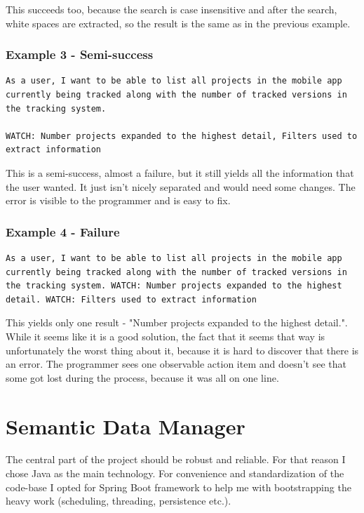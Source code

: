 This succeeds too, because the search is case insensitive and after the search, white spaces are extracted, so the result is the same as in the previous example.

\subsubsection*{Example 3 - Semi-success}

\begin{lstlisting}
As a user, I want to be able to list all projects in the mobile app currently being tracked along with the number of tracked versions in the tracking system.

WATCH: Number projects expanded to the highest detail, Filters used to extract information
\end{lstlisting}

This is a semi-success, almost a failure, but it still yields all the information that the user wanted. It just isn't nicely separated and would need some changes. The error is visible to the programmer and is easy to fix.

\subsubsection*{Example 4 - Failure}

\begin{lstlisting}
As a user, I want to be able to list all projects in the mobile app currently being tracked along with the number of tracked versions in the tracking system. WATCH: Number projects expanded to the highest detail. WATCH: Filters used to extract information
\end{lstlisting}

This yields only one result - "Number projects expanded to the highest detail.". While it seems like it is a good solution, the fact that it seems that way is unfortunately the worst thing about it, because it is hard to discover that there is an error. The programmer sees one observable action item and doesn't see that some got lost during the process, because it was all on one line.

\section{Semantic Data Manager}

The central part of the project should be robust and reliable. For that reason I chose Java as the main technology. For convenience and standardization of the code-base I opted for Spring Boot framework to help me with bootstrapping the heavy work (scheduling, threading, persistence etc.).

